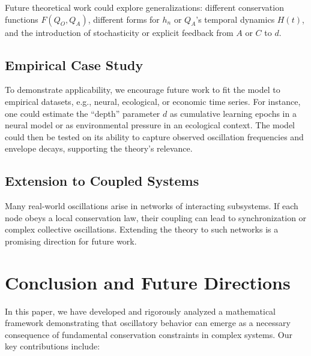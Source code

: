 \documentclass[11pt,a4paper]{article}
\begin{document}
Future theoretical work could explore generalizations: different conservation functions $F(Q_O, Q_A)$, different forms for $h_n$ or $Q_A$'s temporal dynamics $H(t)$, and the introduction of stochasticity or explicit feedback from $A$ or $C$ to $d$.

\subsection{Empirical Case Study}
To demonstrate applicability, we encourage future work to fit the model to empirical datasets, e.g., neural, ecological, or economic time series. For instance, one could estimate the ``depth'' parameter $ d $ as cumulative learning epochs in a neural model or as environmental pressure in an ecological context. The model could then be tested on its ability to capture observed oscillation frequencies and envelope decays, supporting the theory’s relevance.

\subsection{Extension to Coupled Systems}
Many real-world oscillations arise in networks of interacting subsystems.
If each node obeys a local conservation law, their coupling can lead to synchronization or complex collective oscillations.
Extending the theory to such networks is a promising direction for future work.

\section{Conclusion and Future Directions}

In this paper, we have developed and rigorously analyzed a mathematical framework demonstrating that oscillatory behavior can emerge as a necessary consequence of fundamental conservation constraints in complex systems. Our key contributions include:
\end{document}
